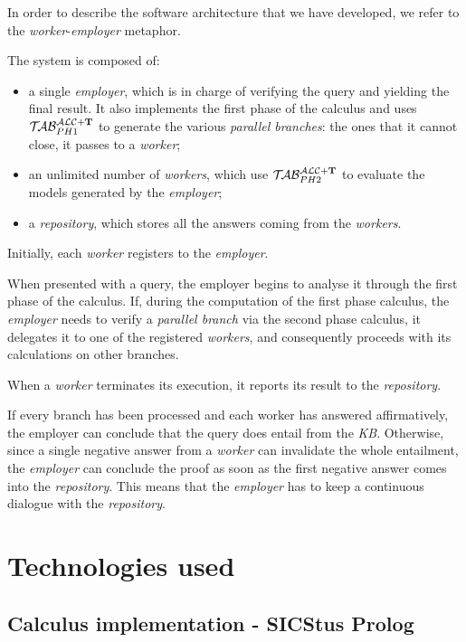 \documentclass[a4paper, 11pt, oneside]{duthesis}
\newcommand{\tip}{{\bf T}}
\newcommand{\primo}{\mathrel{{\mathcal{T}\!\mathcal{AB}}}_{PH 1}^{\mathcal{ALC}+\mbox{\scriptsize $\tip$}}}
\newcommand{\secondo}{\mathrel{{\mathcal{T}\!\mathcal{AB}}}_{PH 2}^{\mathcal{ALC}+\mbox{\scriptsize $\tip$}}}
\begin{document}
In order to describe the software architecture that we have developed, we refer to the \emph{worker}-\emph{employer} metaphor.

The system is composed of:
\begin{itemize}
\item a single \emph{employer}, which is in charge of verifying the query and yielding the final result. It also implements the first phase of the calculus and uses $\primo$ to generate the various \emph{parallel branches}: the ones that it cannot close, it passes to a \emph{worker};
\item an unlimited number of \emph{workers}, which use $\secondo$ to evaluate the models generated by the \emph{employer};
\item a \emph{repository}, which stores all the answers coming from the \emph{workers}.
\end{itemize}
Initially, each \emph{worker} registers to the \emph{employer}.

When presented with a query, the employer begins to analyse it through the first phase of the calculus.
If, during the computation of the first phase calculus, the \emph{employer} needs to verify a \emph{parallel branch} via the second phase calculus, it delegates it to one of the registered \emph{workers}, and consequently proceeds with its calculations on other branches.

When a \emph{worker} terminates its execution, it reports its result to the \emph{repository}.

If every branch has been processed and each worker has answered affirmatively, the employer can conclude that the query does entail from the \emph{KB}.
Otherwise, since a single negative answer from a \emph{worker} can invalidate the whole entailment, the \emph{employer} can conclude the proof as soon as the first negative answer comes into the \emph{repository}.
This means that the \emph{employer} has to keep a continuous dialogue with the \emph{repository}.

\newpage

\section{Technologies used}


\subsection{Calculus implementation - SICStus Prolog}
\end{document}
